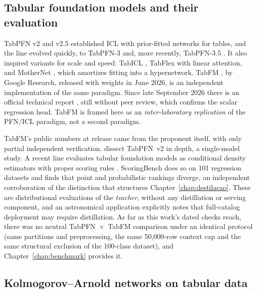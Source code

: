 \subsection{Tabular foundation models and their evaluation}
\label{sec:rel-tfm}

TabPFN v2 \citep{hollmann2025} and v2.5 \citep{priorlabs2025}
established ICL with prior-fitted networks for tables, and the line evolved quickly, to TabPFN-3 \citep{tabpfn3-2026} and, more recently,
TabPFN-3.5 \citep{tabpfn35tr2026}. It also inspired variants for
scale and speed: TabICL \citep{tabicl2025}, TabFlex
\citep{tabflex2025} with linear attention, and MotherNet
\citep{mothernet2023}, which amortizes fitting into a hypernetwork.
TabFM \citep{tabfm2026}, by Google Research, released with weights in June 2026, is an independent implementation of the same
paradigm. Since late September 2026 there is an official technical
report \citep{kong2026}, still without peer review, which confirms
the scalar regression head. TabFM is framed here as an
\emph{inter-laboratory replication} of the PFN/ICL paradigm, not a second paradigm.

TabFM's public numbers at release came from the proponent itself,
with only partial independent verification. \citet{ye2025tabpfnv2}
dissect TabPFN~v2 in depth, a single-model study. A recent line
evaluates tabular foundation models as conditional density estimators
with proper scoring rules \citep{izbicki2026,landsgesell2026}.
ScoringBench \citep{scoringbench2026} does so on 101 regression
datasets and finds that point and probabilistic rankings diverge,
an independent corroboration of the distinction that
structures Chapter~\ref{chap:destilacao}. These are distributional evaluations of the \emph{teacher}, without any
distillation or serving component, and an astronomical application
\citep{photoz2026} explicitly notes that full-catalog deployment may
require distillation. As far as this work's dated checks reach, there was no neutral
TabPFN~$\times$~TabFM comparison under an identical protocol (same partitions and preprocessing, the same 50{,}000-row context cap and the same structural exclusion of the 100-class dataset), and Chapter~\ref{chap:benchmark} provides it.

\subsection{Kolmogorov--Arnold networks on tabular data}
\label{sec:rel-kan}

